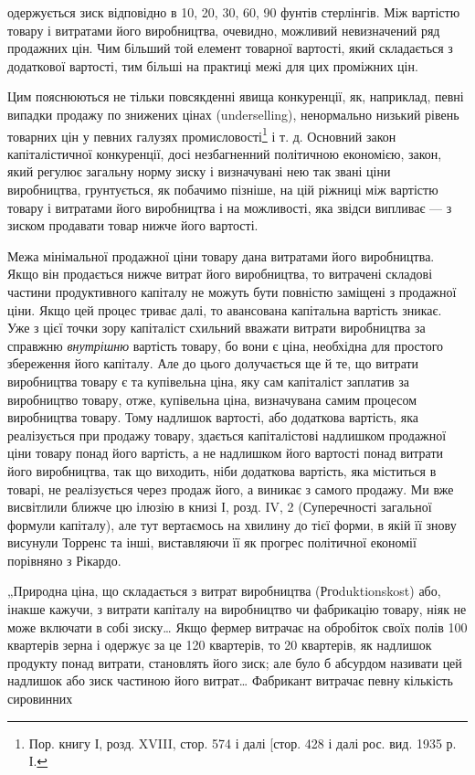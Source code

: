 \parcont{}  %
одержується зиск відповідно в 10, 20, 30, 60, 90 фунтів стерлінгів.
Між вартістю товару і витратами його виробництва, очевидно,
можливий невизначений ряд продажних цін. Чим більший
той елемент товарної вартості, який складається з додаткової
вартості, тим більші на практиці межі для цих проміжних цін.

Цим пояснюються не тільки повсякденні явища конкуренції,
як, наприклад, певні випадки продажу по знижених цінах (underselling),
ненормально низький рівень товарних цін у певних
галузях промисловості\footnote{
Пор. книгу І, розд. XVIII, стор. 574 і далі [стор. 428 і далі рос. вид.
1935 р. І.
} і т. д. Основний закон капіталістичної
конкуренції, досі незбагненний політичною економією, закон,
який регулює загальну норму зиску і визначувані нею так
звані ціни виробництва, грунтується, як побачимо пізніше, на
цій ріжниці між вартістю товару і витратами його виробництва
і на можливості, яка звідси випливає — з зиском продавати
товар нижче його вартості.

Межа мінімальної продажної ціни товару дана витратами
його виробництва. Якщо він продається нижче витрат його
виробництва, то витрачені складові частини продуктивного капіталу
не можуть бути повністю заміщені з продажної ціни.
Якщо цей процес триває далі, то авансована капітальна вартість
зникає. Уже з цієї точки зору капіталіст схильний вважати витрати
виробництва за справжню \emph{внутрішню} вартість товару, бо
вони є ціна, необхідна для простого збереження його капіталу.
Але до цього долучається ще й те, що витрати виробництва
товару є та купівельна ціна, яку сам капіталіст заплатив за
виробництво товару, отже, купівельна ціна, визначувана самим
процесом виробництва товару. Тому надлишок вартості, або
додаткова вартість, яка реалізується при продажу товару,
здається капіталістові надлишком продажної ціни товару понад
його вартість, а не надлишком його вартості понад витрати його
виробництва, так що виходить, ніби додаткова вартість, яка
міститься в товарі, не реалізується через продаж його, а виникає
з самого продажу. Ми вже висвітлили ближче цю ілюзію
в книзі І, розд. IV, 2 (Суперечності загальної формули капіталу),
але тут вертаємось на хвилину до тієї форми, в якій її
знову висунули Торренс та інші, виставляючи її як прогрес політичної
економії порівняно з Рікардо.

„Природна ціна, що складається з витрат виробництва (Ргоduktionskost)
або, інакше кажучи, з витрати капіталу на виробництво
чи фабрикацію товару, ніяк не може включати в собі
зиску\dots{} Якщо фермер витрачає на обробіток своїх полів 100
квартерів зерна і одержує за це 120 квартерів, то 20 квартерів,
як надлишок продукту понад витрати, становлять його зиск;
але було б абсурдом називати цей надлишок або зиск частиною
його витрат\dots{} Фабрикант витрачає певну кількість сировинних
\parbreak{}  %
